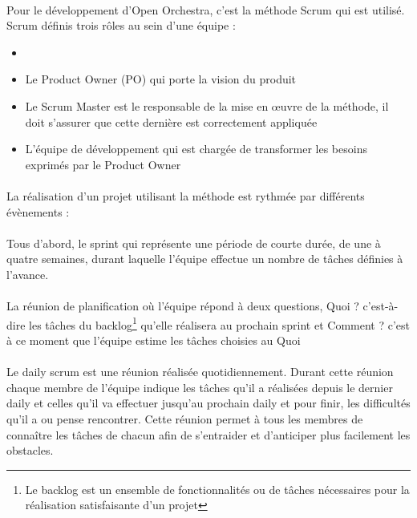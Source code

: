 \paragraph{}
Pour le développement d'Open Orchestra, c'est la méthode Scrum qui est utilisé. Scrum définis trois rôles au sein d'une équipe : 
\begin{itemize}
\item[]
\item  Le \og Product Owner (PO) \fg{} qui porte la vision du produit
\item Le \og Scrum Master \fg{} est le responsable de la mise en œuvre de la méthode, il doit s'assurer que cette dernière est correctement appliquée
\item L'équipe de développement qui est chargée de transformer les besoins exprimés par le Product Owner
\end{itemize}
\paragraph{}
La réalisation d'un projet utilisant la méthode est rythmée par différents évènements : 
\paragraph{}
Tous d'abord, le sprint qui représente une période de courte durée, de une à quatre semaines, durant laquelle l'équipe effectue un nombre de tâches définies à l'avance.
 \paragraph{}
 La réunion de planification où l'équipe répond à deux questions, \og Quoi ? \fg{} c'est-à-dire les tâches du backlog\footnote{Le backlog est un ensemble de fonctionnalités ou de tâches nécessaires pour la réalisation satisfaisante d'un projet} qu'elle réalisera au prochain sprint et \og Comment ? \fg{} c'est à ce moment que l'équipe estime les tâches choisies au \og Quoi \fg{} 

 \paragraph{}
Le \og daily scrum \fg{} est une réunion réalisée quotidiennement. Durant cette réunion chaque membre de l'équipe indique les tâches qu'il a réalisées depuis le dernier daily et celles qu'il va effectuer jusqu'au prochain daily et pour finir, les difficultés qu'il a ou pense rencontrer.
Cette réunion permet à tous les membres de connaître les tâches de chacun afin de s'entraider et d'anticiper plus facilement les obstacles.
